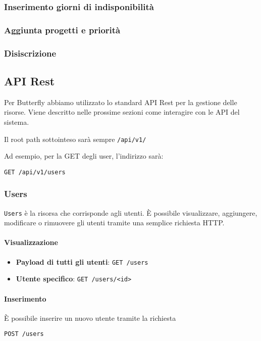 \subsubsection{Inserimento giorni di indisponibilità}

\subsubsection{Aggiunta progetti e priorità}

\subsubsection{Disiscrizione}


\subsection{API Rest}\label{APIRest}

Per Butterfly abbiamo utilizzato lo standard API Rest per la gestione delle risorse.
Viene descritto nelle prossime sezioni come interagire con le API del sistema.

Il root path sottointeso sarà sempre \texttt{\UriImola/api/v1/}

Ad esempio, per la GET degli user, l'indirizzo sarà:
\begin{center}
    \texttt{GET \UriImola/api/v1/users}
\end{center}

\subsubsection{Users}

\texttt{Users} è la risorsa che corrisponde agli utenti.
È possibile visualizzare, aggiungere, modificare o rimuovere gli utenti tramite una semplice
richiesta HTTP.

\paragraph{Visualizzazione}

\begin{itemize}
    \item \textbf{Payload di tutti gli utenti}: \texttt{GET /users}
    \item \textbf{Utente specifico}: \texttt{GET /users/<id>}
\end{itemize}

\paragraph{Inserimento}
È possibile inserire un nuovo utente tramite la richiesta
    \begin{center}
        \texttt{POST /users}
    \end{center}

